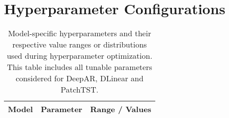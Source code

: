 \documentclass[a4paper,oneside,bibliography=totoc]{scrbook}
\begin{document}
\chapter{Hyperparameter Configurations}
\label{app:hyperparameter}
\begin{table}[htbp]
\caption{Model-specific hyperparameters and their respective value ranges or distributions used during hyperparameter optimization. This table includes all tunable parameters considered for DeepAR, DLinear and PatchTST.}
\centering
\setlength{\tabcolsep}{3pt}
\renewcommand{\arraystretch}{1.2}
\begin{adjustbox}{center}
\begin{tabular}{lp{5cm}p{8cm}}
\toprule
\textbf{Model} & \textbf{Parameter} & \textbf{Range / Values} \\
\midrule


\end{tabular}
\end{adjustbox}
\end{table}
\end{document}
